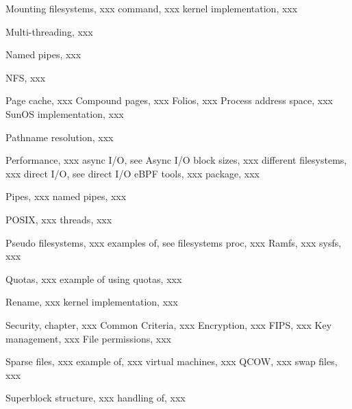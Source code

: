 \begin{theindex}
\indexspace
	 \item Mounting filesystems, xxx
	 	\subitem {} command, xxx
		\subitem kernel implementation, xxx

\indexspace
	 \item Multi-threading, xxx

\indexspace
	 \item Named pipes, xxx

\indexspace
	 \item NFS, xxx

\indexspace
	\item Page cache, xxx
		\subitem Compound pages, xxx
		\subitem Folios, xxx
		\subitem Process address space, xxx
		\subitem SunOS implementation, xxx

\indexspace
	 \item Pathname resolution, xxx

\indexspace
	 \item Performance, xxx
	 	\subitem async I/O, see Async I/O
	 	\subitem block sizes, xxx
	 	\subitem different filesystems, xxx
	 	\subitem direct I/O, see direct I/O
		\subitem eBPF tools, xxx
		\subitem {} package, xxx
\indexspace	
	\item Pipes, xxx
		\subitem named pipes, xxx

\indexspace
	 \item POSIX, xxx
		\subitem threads, xxx

\indexspace
	 \item Pseudo filesystems, xxx
	 	\subitem examples of, see filesystems
	 	\subitem proc, xxx
	 	\subitem Ramfs, xxx
	 	\subitem sysfs, xxx

\indexspace
	 \item Quotas, xxx
	 	\subitem example of using quotas, xxx

\indexspace
	 \item Rename, xxx
	 	\subitem kernel implementation, xxx

\indexspace
	 \item Security, chapter, xxx
	 	\subitem Common Criteria, xxx
	 	\subitem Encryption, xxx
		\subitem FIPS, xxx
	 	\subitem Key management, xxx
		\subitem File permissions, xxx

\indexspace
	 \item Sparse files, xxx
	 	\subitem example of, xxx
		\subitem virtual machines, xxx
		\subitem QCOW, xxx
		\subitem swap files, xxx

\indexspace
	\item Superblock
		\subitem {} structure, xxx
		\subitem {} handling of, xxx


\end{theindex}
